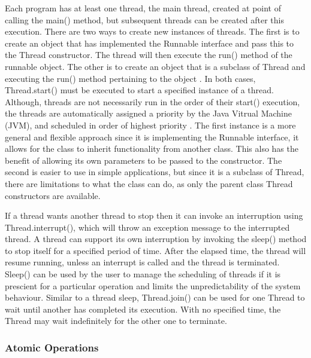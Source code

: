 \documentclass[a4paper,12pt]{article}
\begin{document}
Each program has at least one thread, the main thread, created at point of calling the main() method, but subsequent threads can be created after this execution. There are two ways to create new instances of threads. The first is to create an object that has implemented the Runnable interface and pass this to the Thread constructor. The thread will then execute the run() method of the runnable object. The other is to create an object that is a subclass of Thread and executing the run() method pertaining to the object \citep{concurrency19}. In both cases, Thread.start() must be executed to start a specified instance of a thread. Although, threads are not necessarily run in the order of their start() execution, the threads are automatically assigned a priority by the Java Vitrual Machine (JVM), and scheduled in order of highest priority \citep{mois15}. The first instance is a more general and flexible approach since it is implementing the Runnable interface, it allows for the class to inherit functionality from another class. This also has the benefit of allowing its own parameters to be passed to the constructor. The second is easier to use in simple applications, but since it is a subclass of Thread, there are limitations to what the class can do, as only the parent class Thread constructors are available. 

If a thread wants another thread to stop then it can invoke an interruption using Thread.interrupt(), which will throw an exception message to the interrupted thread. A thread can support its own interruption by invoking the sleep() method to stop itself for a specified period of time. After the elapsed time, the thread will resume running, unless an interrupt is called and the thread is terminated. Sleep() can be used by the user to manage the scheduling of threads if it is prescient for a particular operation and limits the unpredictability of the system behaviour. Similar to a thread sleep, Thread.join() can be used for one Thread to wait until another has completed its execution. With no specified time, the Thread may wait indefinitely for the other one to terminate. 


\subsubsection{Atomic Operations} \label{section:atmoic}
\end{document}
